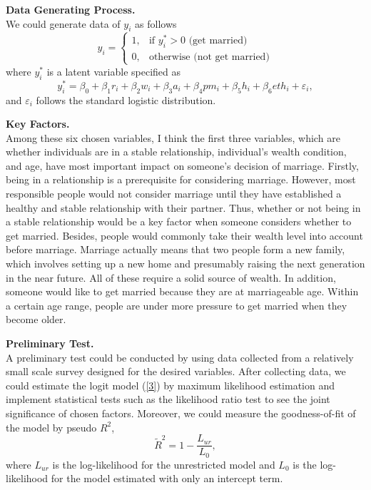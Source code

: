 \documentclass[letterpaper,12pt]{article}
\theoremstyle{definition}
\begin{document}
\noindent\textbf{Data Generating Process.} \\
We could generate data of $y_i$ as follows
\begin{equation}
 y_i=
    \begin{cases}
      1, & \text{if $y_{i}^{\ast}> 0$ (get married)}\\
      0, & \text{otherwise (not get married)} 
    \end{cases}
    \label{4}
\end{equation}
where $y_{i}^{\ast}$ is a latent variable specified as 
\begin{equation}
 y_{i}^{\ast} = \beta_0 + \beta_1r_i + \beta_2w_i + \beta_3a_i + \beta_4pm_i + \beta_5h_i + \beta_6eth_i + \varepsilon_i, 
 \label{5}
\end{equation}
and $\varepsilon_i$ follows the standard logistic distribution. \vspace{2mm}

\noindent\textbf{Key Factors.}\\
Among these six chosen variables, I think the first three variables, which are whether individuals are in a stable relationship, individual's wealth condition, and age, have most important impact on someone's decision of marriage. Firstly, being in a relationship is a prerequisite for considering marriage. However, most responsible people would not consider marriage until they have established a healthy and stable relationship with their partner. Thus, whether or not being in a stable relationship would be a key factor when someone considers whether to get married. Besides, people would commonly take their wealth level into account before marriage. Marriage actually means that two people form a new family, which involves setting up a new home and presumably raising the next generation in the near future. All of these require a solid source of wealth. In addition, someone would like to get married because they are at marriageable age. Within a certain age range, people are under more pressure to get married when they become older. 
\vspace{2mm}

\noindent\textbf{Preliminary Test.}\\
A preliminary test could be conducted by using data collected from a relatively small scale survey designed for the desired variables. After collecting data, we could estimate the logit model (\ref{3}) by maximum likelihood estimation and implement statistical tests such as the likelihood ratio test to see the joint significance of chosen factors. Moreover, we could measure the goodness-of-fit of the model by pseudo $R^2$, $$\tilde{R}^2 = 1 - \frac{L_{ur}}{L_0},$$ where $L_{ur}$ is the log-likelihood for the unrestricted model and $L_0$ is the log-likelihood for the model estimated with only an intercept term. 
\end{document}

